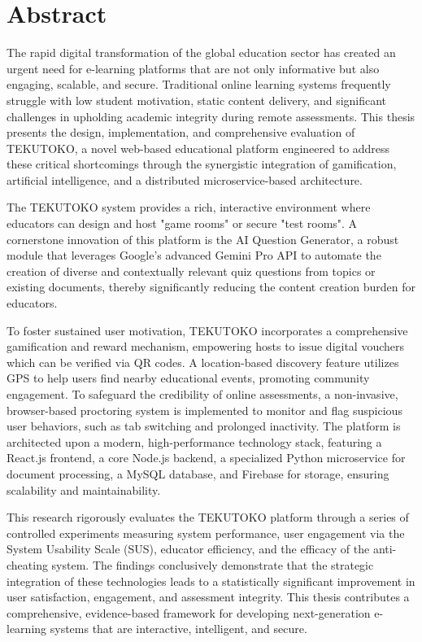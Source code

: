 \chapter*{Abstract}
The rapid digital transformation of the global education sector has created an urgent need for e-learning platforms that are not only informative but also engaging, scalable, and secure. Traditional online learning systems frequently struggle with low student motivation, static content delivery, and significant challenges in upholding academic integrity during remote assessments. This thesis presents the design, implementation, and comprehensive evaluation of TEKUTOKO, a novel web-based educational platform engineered to address these critical shortcomings through the synergistic integration of gamification, artificial intelligence, and a distributed microservice-based architecture.

The TEKUTOKO system provides a rich, interactive environment where educators can design and host "game rooms" or secure "test rooms". A cornerstone innovation of this platform is the AI Question Generator, a robust module that leverages Google's advanced Gemini Pro API to automate the creation of diverse and contextually relevant quiz questions from topics or existing documents, thereby significantly reducing the content creation burden for educators.

To foster sustained user motivation, TEKUTOKO incorporates a comprehensive gamification and reward mechanism, empowering hosts to issue digital vouchers which can be verified via QR codes. A location-based discovery feature utilizes GPS to help users find nearby educational events, promoting community engagement. To safeguard the credibility of online assessments, a non-invasive, browser-based proctoring system is implemented to monitor and flag suspicious user behaviors, such as tab switching and prolonged inactivity. The platform is architected upon a modern, high-performance technology stack, featuring a React.js frontend, a core Node.js backend, a specialized Python microservice for document processing, a MySQL database, and Firebase for storage, ensuring scalability and maintainability.

This research rigorously evaluates the TEKUTOKO platform through a series of controlled experiments measuring system performance, user engagement via the System Usability Scale (SUS), educator efficiency, and the efficacy of the anti-cheating system. The findings conclusively demonstrate that the strategic integration of these technologies leads to a statistically significant improvement in user satisfaction, engagement, and assessment integrity. This thesis contributes a comprehensive, evidence-based framework for developing next-generation e-learning systems that are interactive, intelligent, and secure.

